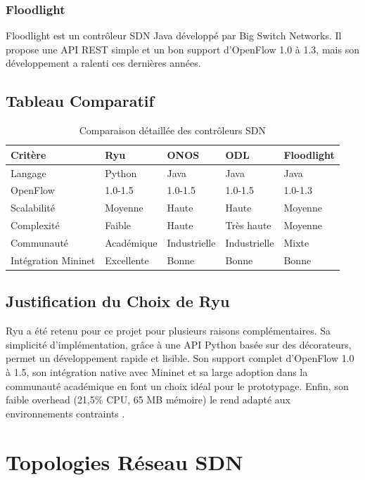 \documentclass[12pt,a4paper]{report}
\begin{document}
\subsubsection{Floodlight}
Floodlight est un contrôleur SDN Java développé par Big
Switch Networks. Il propose une API REST simple et un
bon support d'OpenFlow 1.0 à 1.3, mais son développement
a ralenti ces dernières années.

\subsection{Tableau Comparatif}

\begin{table}[H]
\centering
\caption{Comparaison détaillée des contrôleurs SDN}
\label{tab:controleurs_detail}
\begin{tabular}{lllll}
\toprule
\textbf{Critère} & \textbf{Ryu} & \textbf{ONOS} &
\textbf{ODL} & \textbf{Floodlight} \\
\midrule
Langage & Python & Java & Java & Java \\
OpenFlow & 1.0-1.5 & 1.0-1.5 & 1.0-1.5 & 1.0-1.3 \\
Scalabilité & Moyenne & Haute & Haute & Moyenne \\
Complexité & Faible & Haute & Très haute & Moyenne \\
Communauté & Académique & Industrielle & Industrielle & Mixte \\
Intégration Mininet & Excellente & Bonne & Bonne & Bonne \\
\bottomrule
\end{tabular}
\end{table}

\subsection{Justification du Choix de Ryu}
Ryu a été retenu pour ce projet pour plusieurs raisons
complémentaires. Sa simplicité d'implémentation, grâce à
une API Python basée sur des décorateurs, permet un
développement rapide et lisible. Son support complet
d'OpenFlow 1.0 à 1.5, son intégration native avec Mininet
et sa large adoption dans la communauté académique en font
un choix idéal pour le prototypage. Enfin, son faible
overhead (21,5\% CPU, 65 MB mémoire) le rend adapté aux
environnements contraints \cite{benzekki2016software}.

\section{Topologies Réseau SDN}
\end{document}
